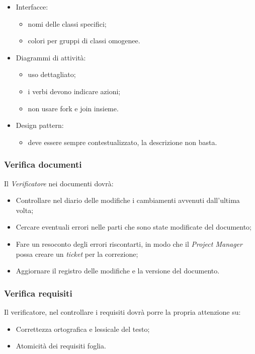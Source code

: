 \documentclass[12pt,a4paper,titlepage]{article}
\begin{document}
\begin{itemize}
\item Interfacce:
	\begin{itemize}
		\item nomi delle classi specifici;
		\item colori per gruppi di classi omogenee.
	\end{itemize}
\item Diagrammi di attività:
	\begin{itemize}
		\item uso dettagliato;
		\item i verbi devono indicare azioni;
		\item non usare fork e join insieme.
	\end{itemize}
\item Design pattern:
	\begin{itemize}
		\item deve essere sempre contestualizzato, la descrizione non basta.
	\end{itemize}
\end{itemize}

\subsubsection{Verifica documenti}
Il \textit{Verificatore} nei documenti dovrà:
\begin{itemize}
	\item Controllare nel diario delle modifiche i cambiamenti avvenuti dall'ultima volta;
	\item Cercare eventuali errori nelle parti che sono state modificate del documento;
	\item Fare un resoconto degli errori riscontarti, in modo che il \textit{Project Manager} possa creare un \textit{ticket} per la correzione;
	\item Aggiornare il registro delle modifiche e la versione del documento.
\end{itemize}

\subsubsection{Verifica requisiti}
Il verificatore, nel controllare i requisiti dovrà porre la propria attenzione su:
\begin{itemize}
	\item Correttezza ortografica e lessicale del testo;
	\item Atomicità dei requisiti foglia.
\end{itemize}
\end{document}
